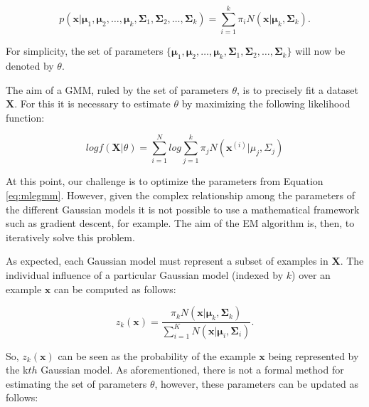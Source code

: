 \begin{equation}
    p(\textbf{x} | \bm{\mu}_1, \bm{\mu}_2,\ldots, \bm{\mu}_k,\bm{\Sigma}_1, \bm{\Sigma}_2, \ldots, \bm{\Sigma}_k) = \sum_{i=1}^k \pi_{i} N(\textbf{x}| \bm{\mu}_k, \bm{\Sigma}_k).
\end{equation}

For simplicity, the set of parameters $\{ \bm{\mu}_1, \bm{\mu}_2,\ldots, \bm{\mu}_k,\bm{\Sigma}_1, \bm{\Sigma}_2, \ldots, \bm{\Sigma}_k\}$ will now be denoted by $\theta$. 

The aim of a GMM, ruled by the set of parameters $\theta$, is to precisely fit a dataset $\mathbf{X}$. For this it is necessary to estimate $\theta$ by maximizing the following likelihood function:



\begin{equation}
    log f(\mathbf{X} | \theta) = \sum_{i = 1}^{N} log \sum_{j = 1}^{k} \pi_{j} N(\mathbf{x}^{(i)} | \mu_j, \Sigma_j)
    \label{eq:mlegmm}
\end{equation}

At this point, our challenge is to optimize the parameters from Equation \ref{eq:mlegmm}. However, given the complex relationship among the parameters of the different Gaussian models it is not possible to use a mathematical framework such as gradient descent, for example. The aim of the EM algorithm is, then, to iteratively solve this problem. 

As expected, each Gaussian model must represent a subset of examples in $\mathbf{X}$. The individual influence of a particular Gaussian model (indexed by $k$) over an example $\mathbf{x}$ can be computed as follows: 

\begin{equation}
    z_k(\mathbf{x}) = \frac{\pi_k N(\mathbf{x} |\bm{\mu}_k, \bm{\Sigma}_k)}{\sum_{i=1}^K N(\mathbf{x} |\bm{\mu}_i, \bm{\Sigma}_i)}.
\end{equation}

So, $z_k(\mathbf{x})$ can be seen as the probability of the example $\mathbf{x}$ being represented by the k$th$ Gaussian model. As aforementioned, there is not a formal method for estimating the set of parameters $\theta$, however, these parameters can be updated as follows: 

